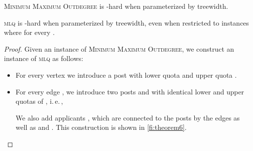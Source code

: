 \documentclass{llncs}
\begin{document}
\begin{theorem}
  \textsc{Minimum Maximum Outdegree} is -hard when parameterized by treewidth.
\end{theorem}

\newcommand{\edgestartpost}[2]{p_{#1,#2}\xspace}
\newcommand{\edgeendpost}[2]{p_{#1,#2}\xspace}
\newcommand{\nodepost}[1]{p_{#1}\xspace}
\newcommand{\edgestartapp}[3]{a^{#3}_{#1,#2}\xspace}
\newcommand{\edgeendapp}[3]{a^{#3}_{#1,#2}\xspace}
\newcommand{\edgeapp}[1]{z_{#1}\xspace}

\begin{theorem}
  \textsc{mlq} is -hard when parameterized by treewidth, even when restricted to instances where  for every .
\end{theorem}

\begin{proof}
  Given an instance  of \textsc{Minimum Maximum Outdegree}, we construct an instance  of \textsc{mlq} as follows:
  \begin{itemize}
   \item For every vertex  we introduce a post  with lower quota  and upper quota . 
   \item For every edge , we introduce two posts  and  with identical lower and upper quotas of , i.\,e.\,, 
   
   We also add  applicants , 
   which are connected to the posts by the edges 
    as well as  and . This construction is shown in \cref{fi:theorem6}.
  \end{itemize}

\begin{figure}[htbp]
\centering
{}
\end{figure}
\end{proof}
\end{document}
